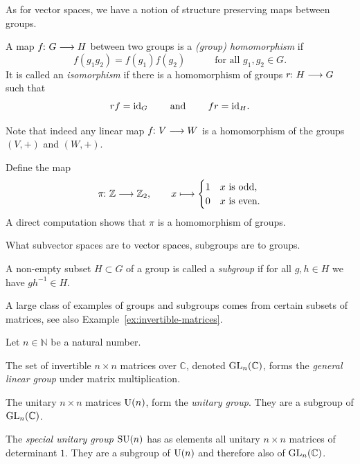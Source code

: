 \documentclass[a4paper, oneside, 12pt]{amsart}
\begin{document}
As for vector spaces, we have a notion of structure preserving maps between groups.

\begin{definition}
  A map \(f\from G\to H\) between two groups is a \emph{(group) homomorphism} if
  \begin{equation}
    f(g_{1} g_{2}) = f(g_{1}) f(g_{2})\qquad\quad \text{for all \(g_{1}, g_{2} \in G\)}.
  \end{equation}
  It is called an \emph{isomorphism} if there is a homomorphism of groups \(r \from H \to G\) such that
  \begin{equation}
    rf = \mathrm{id}_{G}\qquad \text{ and }\qquad fr = \mathrm{id}_{H}.
  \end{equation}
\end{definition}
Note that indeed any linear map \(f\from V\to W\) is a homomorphism of the groups \((V,+)\) and \((W,+)\).

\begin{example}\label{ex:projection-of-z}
  Define the map
  \begin{equation*}
    \pi \from \mathbb{Z} \to \mathbb{Z}_{2}, \qquad x \mapsto
    \begin{cases}
      1 & x \text{ is odd},\\
      0 & x \text{ is even}.
    \end{cases}
  \end{equation*}
  A direct computation shows that \(\pi\) is a homomorphism of groups.
\end{example}

What subvector spaces are to vector spaces, subgroups are to groups.
\begin{definition}\label{def:subgroup}
  A non-empty subset \(H \subset G\) of a group is called a \emph{subgroup} if for all \(g,h \in H\) we have \(gh^{-1} \in H\).
\end{definition}

A large class of examples of groups and subgroups comes from certain subsets of matrices, see also Example~\ref{ex:invertible-matrices}.
\begin{example}
  Let \(n\in \mathbb{N}\) be a natural number.
  \begin{thmlist}
    \item The set of invertible \( n \times n \) matrices over \( \mathbb{C} \), denoted \( \operatorname{GL}_{n}(\mathbb{C}) \), forms the \emph{general linear group} under matrix multiplication.
    \item The unitary \( n \times n \) matrices \( \operatorname{U}(n) \), form  the \emph{unitary group}. They are a subgroup of \(\operatorname{GL}_{n}( \mathbb{C})\).
    \item The \emph{special unitary group} \(\operatorname{SU}(n)\) has as elements all unitary \( n \times n \) matrices of determinant \(1\).
    They are a subgroup of \(\operatorname{U}(n)\) and therefore also of \(\operatorname{GL}_{n}( \mathbb{C})\).
  \end{thmlist}
\end{example}
\end{document}
